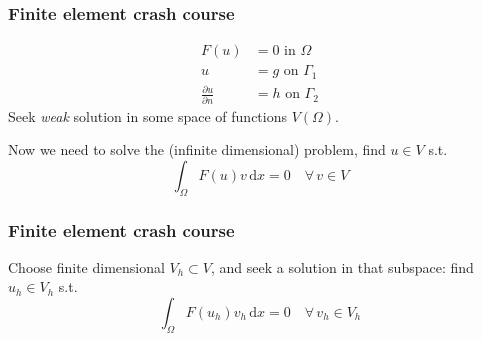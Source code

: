 \documentclass[presentation]{beamer}
\begin{document}
\begin{frame}
  \frametitle{Finite element crash course}
  \begin{align*}
    F(u) &= 0 \text{ in $\Omega$}\\
    u &= g \text{ on $\Gamma_1$}\\
    \frac{\partial u}{\partial n} &= h \text{ on $\Gamma_2$}
  \end{align*}
  Seek \emph{weak} solution in some space of functions $V(\Omega)$.

  Now we need to solve the (infinite dimensional) problem, find $u\in V$ s.t.
  \begin{equation*}
    \int_\Omega \!F(u) v\, \text{d}x = 0 \quad \forall\, v \in V
  \end{equation*}
\end{frame}
\begin{frame}
  \frametitle{Finite element crash course}
  Choose finite dimensional $V_h \subset V$, and seek a solution in
  that subspace: find $u_h \in V_h$ s.t.
  \begin{equation*}
    \int_\Omega \!F(u_h) v_h\, \text{d}x = 0 \quad \forall\, v_h \in V_h
  \end{equation*}
\end{frame}
\end{document}
